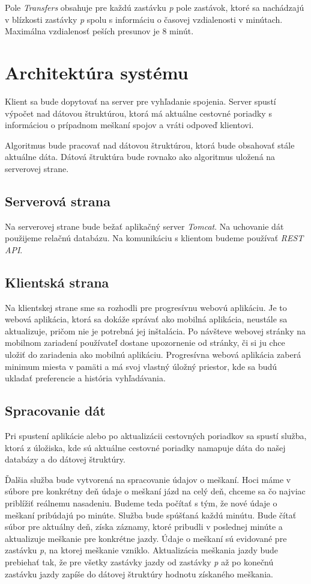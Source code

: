 Pole \textit{Transfers} obsahuje pre každú zastávku \textit{p} pole zastávok, ktoré sa nachádzajú v blízkosti zastávky \textit{p} spolu s informáciu o časovej vzdialenosti v minútach. Maximálna vzdialenosť peších presunov je 8 minút. 


\section{Architektúra systému}

Klient sa bude dopytovať na server pre vyhľadanie spojenia. Server spustí výpočet nad dátovou štruktúrou, ktorá má aktuálne cestovné poriadky s informáciou o prípadnom meškaní spojov a vráti odpoveď klientovi.

Algoritmus bude pracovať nad dátovou štruktúrou, ktorá bude obsahovať stále aktuálne dáta. Dátová štruktúra bude rovnako ako algoritmus uložená na serverovej strane. 

\subsection{Serverová strana}
Na serverovej strane bude bežať aplikačný server \textit{Tomcat}. Na uchovanie dát použijeme relačnú databázu. Na komunikáciu s klientom budeme používať \textit{REST API}.

\subsection{Klientská strana}
Na klientskej strane sme sa rozhodli pre progresívnu webovú aplikáciu. Je to webová aplikácia, ktorá sa dokáže správať ako mobilná aplikácia, neustále sa aktualizuje, pričom nie je potrebná jej inštalácia. Po návšteve webovej stránky na mobilnom zariadení používateľ dostane upozornenie od stránky, či si ju chce uložiť do zariadenia ako mobilnú aplikáciu. Progresívna webová aplikácia zaberá minimum miesta v pamäti a má svoj vlastný úložný priestor, kde sa budú ukladať preferencie a história vyhľadávania.

\subsection{Spracovanie dát}
Pri spustení aplikácie alebo po aktualizácii cestovných poriadkov sa spustí služba, ktorá z úložiska, kde sú aktuálne cestovné poriadky namapuje dáta do našej databázy a do dátovej štruktúry. 

Ďalšia služba bude vytvorená na spracovanie údajov o meškaní. Hoci máme v súbore pre konkrétny deň údaje o meškaní jázd na celý deň, chceme sa čo najviac priblížiť reálnemu nasadeniu. Budeme teda počítať s tým, že nové údaje o meškaní pribúdajú po minúte. Služba bude spúšťaná každú minútu. Bude čítať súbor pre aktuálny deň, získa záznamy, ktoré pribudli v poslednej minúte a aktualizuje meškanie pre konkrétne jazdy. Údaje o meškaní sú evidované pre zastávku \textit{p}, na ktorej meškanie vzniklo. Aktualizácia meškania jazdy bude prebiehať tak, že pre všetky zastávky jazdy od zastávky \textit{p} až po konečnú zastávku jazdy zapíše do dátovej štruktúry hodnotu získaného meškania.

